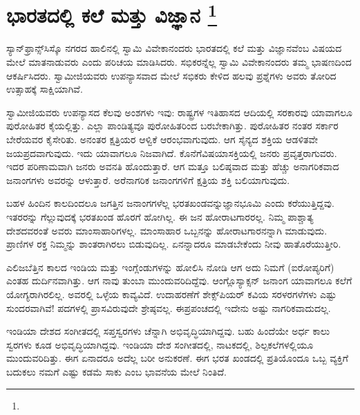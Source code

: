 
\chapter[ಭಾರತದಲ್ಲಿ ಕಲೆ ಮತ್ತು ವಿಜ್ಞಾನ ]{ಭಾರತದಲ್ಲಿ ಕಲೆ ಮತ್ತು ವಿಜ್ಞಾನ \protect\footnote{}}

ಸ್ಯಾನ್​ಫ್ರಾನ್ಸ್​ಸಿಸ್ಕೊ ನಗರದ ಹಾಲಿನಲ್ಲಿ ಸ್ವಾಮಿ ವಿವೇಕಾನಂದರು ಭಾರತದಲ್ಲಿ ಕಲೆ ಮತ್ತು ವಿಜ್ಞಾನವೆಂಬ ವಿಷಯದ ಮೇಲೆ ಮಾತನಾಡುವರು ಎಂದು ಪರಿಚಯ ಮಾಡಿಸಿದರು. ಸಭಿಕರನ್ನೆಲ್ಲ ಸ್ವಾಮಿ ವಿವೇಕಾನಂದರು ತಮ್ಮ ಭಾಷಣದಿಂದ ಆಕರ್ಷಿಸಿದರು. ಸ್ವಾಮೀಜಿಯವರು ಉಪನ್ಯಾಸವಾದ ಮೇಲೆ ಸಭಿಕರು ಕೇಳಿದ ಹಲವು ಪ್ರಶ್ನೆಗಳು ಅವರು ತೋರಿದ ಉತ್ಸಾಹಕ್ಕೆ ಸಾಕ್ಷಿಯಾಗಿವೆ.

ಸ್ವಾಮೀಜಿಯವರು ಉಪನ್ಯಾಸದ ಕೆಲವು ಅಂಶಗಳು ಇವು: ರಾಷ್ಟ್ರಗಳ ಇತಿಹಾಸದ ಆದಿಯಲ್ಲಿ ಸರಕಾರವು ಯಾವಾಗಲೂ ಪುರೋಹಿತರ ಕೈಯಲ್ಲಿತ್ತು. ಎಲ್ಲಾ ಪಾಂಡಿತ್ಯವೂ ಪುರೋಹಿತರಿಂದ ಬರಬೇಕಾಗಿತ್ತು. ಪುರೋಹಿತರ ನಂತರ ಸರ್ಕಾರ ಬೇರೆಯವರ ಕೈಸೇರಿತು. ಅನಂತರ ಕ್ಷತ್ರಿಯರ ಆಳ್ವಿಕೆ ಆರಂಭವಾಗುವುದು. ಆಗ ಸೈನ್ಯದ ಶಕ್ತಿಯ ಆಡಳಿತವೇ ಜಯಪ್ರದವಾಗುವುದು. ಇದು ಯಾವಾಗಲೂ ನಿಜವಾಗಿದೆ. ಕೊನೆಗೆ\break ವಿಷಯಾಸಕ್ತಿಯಲ್ಲಿ ಜನರು ಪ್ರವೃತ್ತರಾಗುವರು. ಇದರ ಪರಿಣಾಮವಾಗಿ ಜನರು ಅವನತಿ ಹೊಂದುತ್ತಾರೆ. ಆಗ ಮತ್ತೂ ಬಲಿಷ್ಠವಾದ ಮತ್ತು ಹೆಚ್ಚು ಅನಾಗರಿಕವಾದ ಜನಾಂಗಗಳು ಅವರನ್ನು ಆಳುತ್ತಾರೆ. ಅರೆನಾಗರಿಕ ಜನಾಂಗಗಳಿಗೆ ಕ್ಷತ್ರಿಯ ಶಕ್ತಿ ಬಲಿಯಾಗುವುದು.

ಬಹಳ ಹಿಂದಿನ ಕಾಲದಿಂದಲೂ ಜಗತ್ತಿನ ಜನಾಂಗಗಳೆಲ್ಲ ಭರತಖಂಡವನ್ನು\break ಜ್ಞಾನಭೂಮಿ ಎಂದು ಕರೆಯುತ್ತಿದ್ದವು. ಇತರರನ್ನು ಗೆಲ್ಲುವುದಕ್ಕೆ ಭರತಖಂಡ ಹೊರಗೆ ಹೋಗಿಲ್ಲ. ಈ ಜನ ಹೋರಾಟಗಾರರಲ್ಲ. ನಿಮ್ಮ ಪಾಶ್ಚಾತ್ಯ ದೇಶದವರಂತೆ ಅವರು ಮಾಂಸಾಹಾರಿಗಳಲ್ಲ. ಮಾಂಸಾಹಾರ ಒಬ್ಬನನ್ನು ಹೋರಾಟಗಾರನನ್ನಾಗಿ ಮಾಡುವುದು. ಪ್ರಾಣಿಗಳ ರಕ್ತ ನಿಮ್ಮನ್ನು ಶಾಂತರಾಗಿರಲು ಬಿಡುವುದಿಲ್ಲ. ಏನನ್ನಾದರೂ ಮಾಡಬೇಕೆಂದು ನೀವು ಹಾತೊರೆಯುತ್ತೀರಿ.

ಎಲಿಜಬೆತ್ತಿನ ಕಾಲದ ಇಂಡಿಯ ಮತ್ತು ಇಂಗ್ಲೆಂಡುಗಳನ್ನು ಹೋಲಿಸಿ ನೋಡಿ ಆಗ ಅದು ನಿಮಗೆ (ಐರೋಪ್ಯರಿಗೆ) ಎಂತಹ ದುರ್ದಿನವಾಗಿತ್ತು. ಆಗ ನಾವು ತುಂಬಾ ಮುಂದುವರಿದಿದ್ದೆವು. ಆಂಗ್ಲೊಸ್ಯಾಕ್ಸನ್​ ಜನಾಂಗ ಯಾವಾಗಲೂ ಕಲೆಗೆ ಯೋಗ್ಯರಾಗಿರಲಿಲ್ಲ. ಅವರಲ್ಲಿ ಒಳ್ಳೆಯ ಕಾವ್ಯವಿದೆ. ಉದಾಹರಣೆಗೆ ಶೇಕ್ಸ್​ಪಿಯರ್​ ಕವಿಯ ಸರಳ\break ರಗಳೆಗಳು ಎಷ್ಟು ಸುಂದರವಾಗಿವೆ! ಪದಗಳಲ್ಲಿ ಪ್ರಾಸವಿರುವುದೇ ಶ್ರೇಷ್ಠವಲ್ಲ. ಈ\break ಪ್ರಪಂಚದಲ್ಲಿ ಇದೇನು ಅಷ್ಟು ನಾಗರಿಕವಾದುದಲ್ಲ.

ಇಂಡಿಯಾ ದೇಶದ ಸಂಗೀತದಲ್ಲಿ ಸಪ್ತಸ್ವರಗಳು ಚೆನ್ನಾಗಿ ಅಭಿವೃದ್ಧಿಯಾಗಿದ್ದವು. ಬಹು ಹಿಂದೆಯೇ ಅರ್ಧ ಕಾಲು ಸ್ವರಗಳು ಕೂಡ ಅಭಿವೃದ್ಧಿಯಾಗಿದ್ದವು. ಇಂಡಿಯಾ ದೇಶ ಸಂಗೀತದಲ್ಲಿ, ನಾಟಕದಲ್ಲಿ, ಶಿಲ್ಪಕಲೆಗಳಲ್ಲಿಯೂ ಮುಂದುವರಿದಿತ್ತು. ಈಗ ಏನಾದರೂ ಅದೆಲ್ಲ ಬರೀ ಅನುಕರಣೆ. ಈಗ ಭರತ ಖಂಡದಲ್ಲಿ ಪ್ರತಿಯೊಂದೂ ಒಬ್ಬ ವ್ಯಕ್ತಿಗೆ ಬದುಕಲು ನಮಗೆ ಎಷ್ಟು ಕಡಮೆ ಸಾಕು ಎಂಬ ಭಾವನೆಯ ಮೇಲೆ ನಿಂತಿದೆ.

